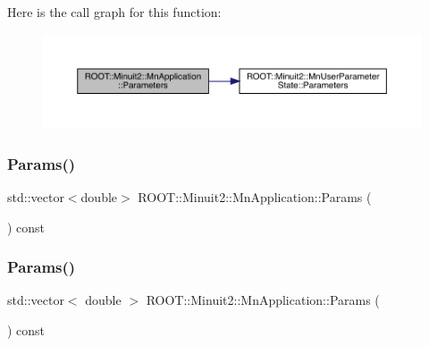 Here is the call graph for this function\+:
\nopagebreak
\begin{figure}[H]
\begin{center}
\leavevmode
\includegraphics[width=350pt]{df/dd5/classROOT_1_1Minuit2_1_1MnApplication_a8a6af4bd7d2f8af8524bca7a67b2f62d_cgraph}
\end{center}
\end{figure}
\mbox{\label{classROOT_1_1Minuit2_1_1MnApplication_ae821bfc8bb4659bd3b01835c1d58387c}} 
\subsubsection{\texorpdfstring{Params()}{Params()}\hspace{0.1cm}{\footnotesize\ttfamily [1/3]}}
{\footnotesize\ttfamily std\+::vector$<$double$>$ R\+O\+O\+T\+::\+Minuit2\+::\+Mn\+Application\+::\+Params (\begin{DoxyParamCaption}{ }\end{DoxyParamCaption}) const}

\mbox{\label{classROOT_1_1Minuit2_1_1MnApplication_ad4a7808d299103c748b01bd9c2f5b91d}} 
\subsubsection{\texorpdfstring{Params()}{Params()}\hspace{0.1cm}{\footnotesize\ttfamily [2/3]}}
{\footnotesize\ttfamily std\+::vector$<$ double $>$ R\+O\+O\+T\+::\+Minuit2\+::\+Mn\+Application\+::\+Params (\begin{DoxyParamCaption}{ }\end{DoxyParamCaption}) const}

